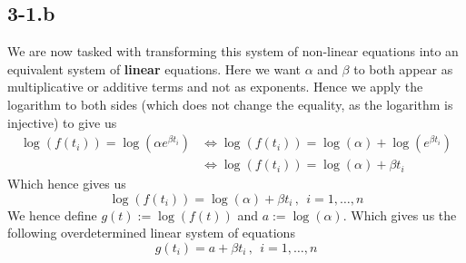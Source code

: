 \documentclass{article}
\begin{document}
\subsection*{3-1.b}
We are now tasked with transforming this system of non-linear equations into an equivalent system of \textbf{linear} equations. Here we want $\alpha$ and $\beta$ to both appear as multiplicative or additive terms and not as exponents. Hence we apply the logarithm to both sides (which does not change the equality, as the logarithm is injective) to give us
\begin{align*}
 \log\left(f\left(t_{i}\right)\right) = \log\left(\alpha e^{\beta t_{i}}\right) &\Longleftrightarrow \log\left(f\left(t_{i}\right)\right) =\log\left(\alpha\right) + \log\left(e^{\beta t_{i}}\right) \\
 &\Longleftrightarrow \log\left(f\left(t_{i}\right)\right) =\log\left(\alpha\right) + \beta t_{i}
\end{align*}
Which hence gives us
\begin{equation*}
\log\left(f\left(t_{i}\right)\right) = \log\left(\alpha\right) + \beta t_{i}\,, \: \: i = 1, \dots, n
\end{equation*}
We hence define $g\left(t\right) := \log\left(f\left(t\right)\right)$ and $a := \log\left(\alpha\right)$. Which gives us the following overdetermined linear system of equations
\begin{equation}
    g\left(t_{i}\right) = a + \beta t_{i} \,, \: \: i = 1, \dots, n
\end{equation}

\pagebreak 
\end{document}
